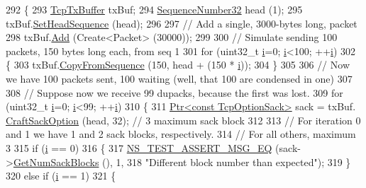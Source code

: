 \begin{DoxyCode}
292 \{
293   \hyperlink{classns3_1_1TcpTxBuffer}{TcpTxBuffer} txBuf;
294   \hyperlink{classns3_1_1SequenceNumber}{SequenceNumber32} head (1);
295   txBuf.\hyperlink{classns3_1_1TcpTxBuffer_ae9d25292f14d338abe26a2657e103921}{SetHeadSequence} (head);
296 
297   \textcolor{comment}{// Add a single, 3000-bytes long, packet}
298   txBuf.\hyperlink{classns3_1_1TcpTxBuffer_a275d96f2c58333c9e7c5fe0f1fa152e1}{Add} (Create<Packet> (30000));
299 
300   \textcolor{comment}{// Simulate sending 100 packets, 150 bytes long each, from seq 1}
301   \textcolor{keywordflow}{for} (uint32\_t \hyperlink{bernuolliDistribution_8m_a6f6ccfcf58b31cb6412107d9d5281426}{i}=0; \hyperlink{bernuolliDistribution_8m_a6f6ccfcf58b31cb6412107d9d5281426}{i}<100; ++\hyperlink{bernuolliDistribution_8m_a6f6ccfcf58b31cb6412107d9d5281426}{i})
302     \{
303       txBuf.\hyperlink{classns3_1_1TcpTxBuffer_a5eb9c889cfad2cd11a5ccf996c506fd3}{CopyFromSequence} (150, head + (150 * \hyperlink{bernuolliDistribution_8m_a6f6ccfcf58b31cb6412107d9d5281426}{i}));
304     \}
305 
306   \textcolor{comment}{// Now we have 100 packets sent, 100 waiting (well, that 100 are condensed in one)}
307 
308   \textcolor{comment}{// Suppose now we receive 99 dupacks, because the first was lost.}
309   \textcolor{keywordflow}{for} (uint32\_t \hyperlink{bernuolliDistribution_8m_a6f6ccfcf58b31cb6412107d9d5281426}{i}=0; \hyperlink{bernuolliDistribution_8m_a6f6ccfcf58b31cb6412107d9d5281426}{i}<99; ++\hyperlink{bernuolliDistribution_8m_a6f6ccfcf58b31cb6412107d9d5281426}{i})
310     \{
311       \hyperlink{classns3_1_1Ptr}{Ptr<const TcpOptionSack>} sack = txBuf.
      \hyperlink{classns3_1_1TcpTxBuffer_af49d6395ebebed5e4ca8697e7331b79e}{CraftSackOption} (head, 32); \textcolor{comment}{// 3 maximum sack block}
312 
313       \textcolor{comment}{// For iteration 0 and 1 we have 1 and 2 sack blocks, respectively.}
314       \textcolor{comment}{// For all others, maximum 3}
315       \textcolor{keywordflow}{if} (\hyperlink{bernuolliDistribution_8m_a6f6ccfcf58b31cb6412107d9d5281426}{i} == 0)
316         \{
317           \hyperlink{group__testing_ga2a9d78cffb3db8e867c35fff0b698cf5}{NS\_TEST\_ASSERT\_MSG\_EQ} (sack->\hyperlink{classns3_1_1TcpOptionSack_a4700d3fed6cd67def0c18ce47298e767}{GetNumSackBlocks} (), 1,
318                                  \textcolor{stringliteral}{"Different block number than expected"});
319         \}
320       \textcolor{keywordflow}{else} \textcolor{keywordflow}{if} (\hyperlink{bernuolliDistribution_8m_a6f6ccfcf58b31cb6412107d9d5281426}{i} == 1)
321         \{

\end{DoxyCode}
